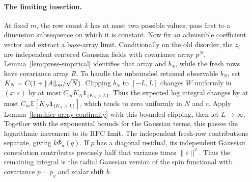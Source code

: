 \documentclass[11pt,a4paper]{article}
\numberwithin{equation}{section}
\theoremstyle{definition}
\theoremstyle{remark}
\newcommand{\E}{\mathbb E}
\newcommand{\ind}{\mathbf 1}
\newcommand{\eps}{\varepsilon}
\begin{document}
\paragraph{The limiting insertion.}
At fixed $m$, the row count $k$ has at most two possible values; pass first
to a dimension subsequence on which it is constant. Now fix an admissible
coefficient vector and extract a base-array limit.
Conditionally on the old disorder, the $z_i$ are independent centered Gaussian
fields with covariance array $p^N$. Lemma~\ref{lem:press-empirical} identifies
that array and $b_N$, while the fresh rows have covariance array $R$.
To handle the unbounded retained observable $b_N$, set
$K_N=C(1+\|A\|_{\rm op}/\sqrt N)$. Clipping $b_N$ to $[-L,L]$ changes $W$
uniformly in $(x,\eps)$ by at most
$C_mK_N\ind_{\{K_N>L\}}$. Thus the expected log integral changes by at most
$C_m\E[K_N\ind_{\{K_N>L\}}]$, which tends to zero uniformly in $N$ and
$c$. Apply Lemma~\ref{lem:hier-array-continuity} with this bounded clipping,
then let $L\to\infty$. Together with the exponential bounds for the Gaussian
terms, this passes the logarithmic increment to its RPC limit. The independent fresh-row contributions separate, giving
$k\Phi_u(q)$. If $p$ has a diagonal residual, its independent Gaussian
convolution contributes precisely half that variance times $\|\eps\|^2$.
Thus the remaining integral is the radial Gaussian version of the spin
functional with covariance $p=p_q$ and scalar shift $b$.
\end{document}
